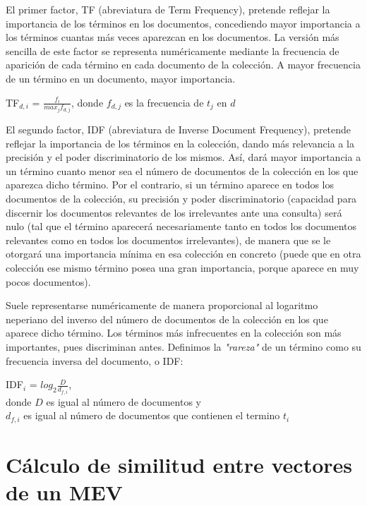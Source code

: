 \documentclass[titlepage]{article}
\begin{document}
	El primer factor, TF (abreviatura de Term Frequency), pretende reflejar la importancia de los términos en los documentos, concediendo mayor importancia a los términos cuantas más veces aparezcan en los documentos. La versión más sencilla de este factor se representa numéricamente mediante la frecuencia de aparición de cada término en cada documento de la colección. A mayor frecuencia de un término en un documento, mayor
	importancia.
	
	\begin{center}
		TF$_{d, i}$ = $\frac{f_{i}}{max_{j} f_{d, j}}$, 
		donde $f_{d, j}$ es la frecuencia de $t_{j}$ en $d$
	\end{center}
	
	El segundo factor, IDF (abreviatura de Inverse Document Frequency), pretende reflejar la importancia de los términos en la colección, dando más relevancia a la precisión y el poder discriminatorio de los mismos. Así, dará mayor importancia a un término cuanto menor sea el número de documentos de la colección en los que aparezca dicho término. Por el contrario, si un término aparece en todos los documentos de la colección, su precisión y poder discriminatorio (capacidad para discernir los documentos relevantes de los irrelevantes ante una consulta) será nulo (tal que el término aparecerá necesariamente tanto en todos los documentos relevantes como en todos los documentos irrelevantes), de manera que se le otorgará una importancia mínima en esa colección en concreto (puede que en otra colección ese mismo término posea una gran importancia, porque aparece en muy pocos documentos). 
	
	Suele representarse numéricamente de manera proporcional al logaritmo neperiano del inverso del número de documentos de la colección en los que aparece dicho término. Los términos más infrecuentes en la colección son más importantes, pues discriminan antes. Definimos la \textit{"rareza"} de un término como su frecuencia inversa del documento, o IDF:
	
	\begin{center}
		IDF$_{i}$ = $log_{2} \frac{D}{d_{f, i}}$, \\
		donde $D$ es igual al número de documentos y \\ 
		$d_{f, i}$ es igual al número de documentos que contienen el termino $t_{i}$
	\end{center}
	
	\section{Cálculo de similitud entre vectores de un MEV}\label{similitud}
	
\end{document}
